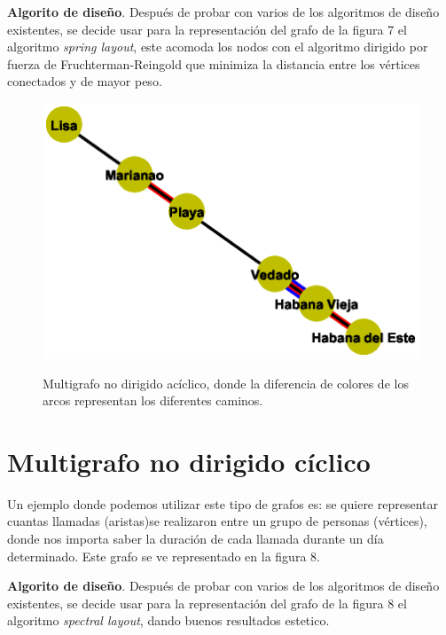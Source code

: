 \documentclass{article}
\begin{document}
\textbf{Algorito de diseño}.\linebreak
Después de probar con varios de los algoritmos de diseño existentes, se decide usar para la representación del grafo de la figura 7 el algoritmo \textit{spring layout}, este acomoda los nodos con el algoritmo dirigido por fuerza de Fruchterman-Reingold que minimiza la distancia entre los vértices conectados y de mayor peso.
\begin{center}

\end{center}
\begin{figure}[h]
\begin{center}
\includegraphics[scale=0.7]{Graf7_spring_layout.eps}\\
\caption{Multigrafo no dirigido acíclico, donde la diferencia de colores de los arcos representan los diferentes caminos.}
\end{center}
\end{figure}
\section{Multigrafo no dirigido cíclico}

Un ejemplo donde podemos utilizar este tipo de grafos es: se quiere representar cuantas llamadas (aristas)se realizaron entre un grupo de personas (vértices), donde nos importa saber la duración de cada llamada durante un día determinado. Este grafo se ve representado en la figura 8.\linebreak

\textbf{Algorito de diseño}.\linebreak
Después de probar con varios de los algoritmos de diseño existentes, se decide usar para la representación del grafo de la figura 8 el algoritmo \textit{spectral layout}, dando buenos resultados estetico.
\end{document}
